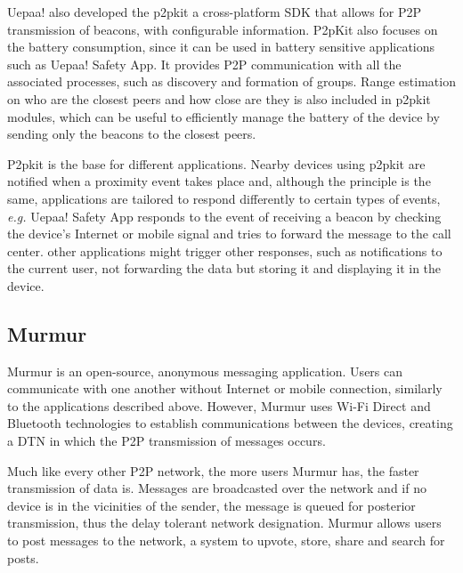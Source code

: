 Uepaa! also developed the p2pkit a cross-platform \gls{SDK} that allows for P2P transmission of beacons, with configurable information. P2pKit also focuses on the battery consumption, since it can be used in battery sensitive applications such as Uepaa! Safety App. It provides P2P communication with all the associated processes, such as discovery and formation of groups. Range estimation on who are the closest peers and how close are they is also included in p2pkit modules, which can be useful to efficiently manage the battery of the device by sending only the beacons to the closest peers.

P2pkit is the base for different applications. Nearby devices using p2pkit are notified when a proximity event takes place and, although the principle is the same, applications are tailored to respond differently to certain types of events, \textit{e.g.} Uepaa! Safety App responds to the event of receiving a beacon by checking the device's Internet or mobile signal and tries to forward the message to the call center. other applications might trigger other responses, such as notifications to the current user, not forwarding the data but storing it and displaying it in the device.

\subsection{Murmur}

Murmur is an open-source, anonymous messaging application. Users can communicate with one another without Internet or mobile connection, similarly to the applications described above. However, Murmur uses Wi-Fi Direct and Bluetooth technologies to establish communications between the devices, creating a \gls{DTN} in which the P2P transmission of messages occurs.

Much like every other P2P network, the more users Murmur has, the faster transmission of data is. Messages are broadcasted over the network and if no device is in the vicinities of the sender, the message is queued for posterior transmission, thus the delay tolerant network designation. Murmur allows users to post messages to the network, a system to upvote, store, share and search for posts.

